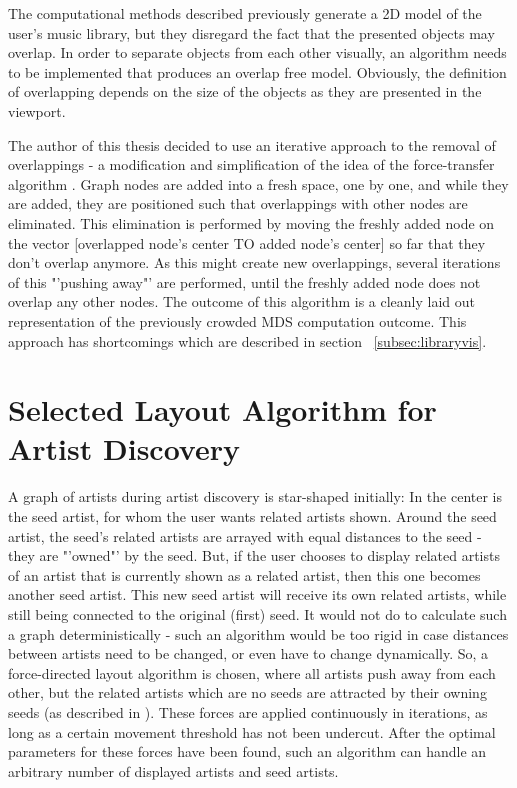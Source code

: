The computational methods described previously generate a 2D model of the user's music library, but they disregard the fact that the presented objects may overlap. In order to separate objects from each other visually, an algorithm needs to be implemented that produces an overlap free model. Obviously, the definition of overlapping depends on the size of the objects as they are presented in the viewport.

The author of this thesis decided to use an iterative approach to the removal of overlappings - a modification and simplification of the idea of the force-transfer algorithm \cite{Huang03force-transfer:a}. Graph nodes are added into a fresh space, one by one, and while they are added, they are positioned such that overlappings with other nodes are eliminated. This elimination is performed by moving the freshly added node on the vector [overlapped node's center TO added node's center] so far that they don't overlap anymore. As this might create new overlappings, several iterations of this "'pushing away"' are performed, until the freshly added node does not overlap any other nodes. The outcome of this algorithm is a cleanly laid out representation of the previously crowded MDS computation outcome. This approach has shortcomings which are described in section ~\ref{subsec:libraryvis}.

\section{Selected Layout Algorithm for Artist Discovery}
\label{sec:selected-algorithm-discovery}

A graph of artists during artist discovery is star-shaped initially: In the center is the seed artist, for whom the user wants related artists shown. Around the seed artist, the seed's related artists are arrayed with equal distances to the seed - they are "'owned"' by the seed. But, if the user chooses to display related artists of an artist that is currently shown as a related artist, then this one becomes another seed artist. This new seed artist will receive its own related artists, while still being connected to the original (first) seed. It would not do to calculate such a graph deterministically - such an algorithm would be too rigid in case distances between artists need to be changed, or even have to change dynamically. So, a force-directed layout algorithm is chosen, where all artists push away from each other, but the related artists which are no seeds are attracted by their owning seeds (as described in \cite{Kobourov04}). These forces are applied continuously in iterations, as long as a certain movement threshold has not been undercut. After the optimal parameters for these forces have been found, such an algorithm can handle an arbitrary number of displayed artists and seed artists.

